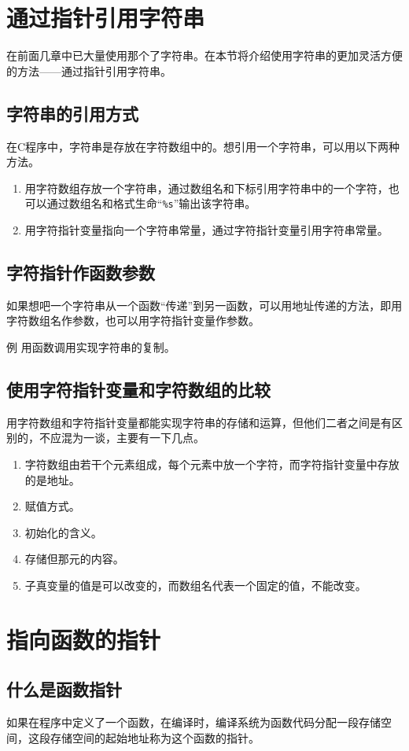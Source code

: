 \section{通过指针引用字符串}
在前面几章中已大量使用那个了字符串。在本节将介绍使用字符串的更加灵活方便的方法——通过指针引用字符串。
\subsection{字符串的引用方式}
在C程序中，字符串是存放在字符数组中的。想引用一个字符串，可以用以下两种方法。
\begin{enumerate}
	\item 用字符数组存放一个字符串，通过数组名和下标引用字符串中的一个字符，也可以通过数组名和格式生命“\verb|%s|”输出该字符串。
	\item 用字符指针变量指向一个字符串常量，通过字符指针变量引用字符串常量。
\end{enumerate}
\subsection{字符指针作函数参数}
如果想吧一个字符串从一个函数“传递”到另一函数，可以用地址传递的方法，即用字符数组名作参数，也可以用字符指针变量作参数。

例 用函数调用实现字符串的复制。
\subsection{使用字符指针变量和字符数组的比较}
用字符数组和字符指针变量都能实现字符串的存储和运算，但他们二者之间是有区别的，不应混为一谈，主要有一下几点。
\begin{enumerate}
	\item 字符数组由若干个元素组成，每个元素中放一个字符，而字符指针变量中存放的是地址。
	\item 赋值方式。
	\item 初始化的含义。
	\item 存储但那元的内容。
	\item 子真变量的值是可以改变的，而数组名代表一个固定的值，不能改变。
\end{enumerate}


\section{指向函数的指针}
\subsection{什么是函数指针}
如果在程序中定义了一个函数，在编译时，编译系统为函数代码分配一段存储空间，这段存储空间的起始地址称为这个函数的指针。


